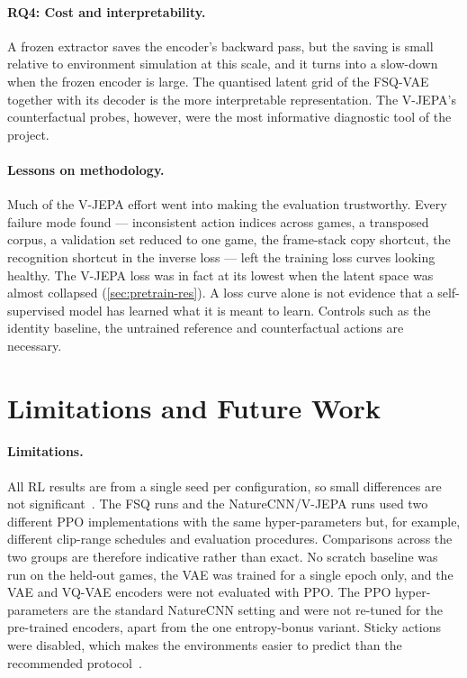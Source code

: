 \documentclass[runningheads]{llncs}
\begin{document}
\paragraph{RQ4: Cost and interpretability.}
A frozen extractor saves the encoder's backward pass, but the saving is small relative to
environment simulation at this scale, and it turns into a slow-down when the frozen
encoder is large. The quantised latent grid of the FSQ-VAE together with its decoder is
the more interpretable representation. The V-JEPA's counterfactual probes, however, were
the most informative diagnostic tool of the project.

\paragraph{Lessons on methodology.}
Much of the V-JEPA effort went into making the evaluation trustworthy. Every failure mode
found --- inconsistent action indices across games, a transposed corpus, a validation set
reduced to one game, the frame-stack copy shortcut, the recognition shortcut in the
inverse loss --- left the training loss curves looking healthy. The V-JEPA loss was in
fact at its lowest when the latent space was almost collapsed (\cref{sec:pretrain-res}).
A loss curve alone is not evidence that a self-supervised model has learned what it is
meant to learn. Controls such as the identity baseline, the untrained reference and
counterfactual actions are necessary.

\section{Limitations and Future Work}
\label{sec:limits}

\paragraph{Limitations.}
All RL results are from a single seed per configuration, so small differences are not
significant~\cite{agarwal2021precipice}. The FSQ runs and the NatureCNN/V-JEPA runs used
two different PPO implementations with the same hyper-parameters but, for example,
different clip-range schedules and evaluation procedures. Comparisons across the two groups
are therefore indicative rather than exact. No scratch baseline was run on the held-out games,
the VAE was trained for a single epoch only, and the VAE and VQ-VAE encoders were not
evaluated with PPO. The PPO hyper-parameters are the standard NatureCNN setting and were
not re-tuned for the pre-trained encoders, apart from the one entropy-bonus variant. Sticky actions were
disabled, which makes the environments easier to predict than the recommended
protocol~\cite{machado2018revisiting}.
\end{document}
